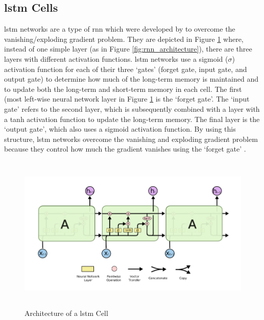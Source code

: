 \subsection{\acrlong{lstm} Cells}\label{sec:background_lstms}
\acrfull{lstm} networks are a type of \acrlong{rnn} which were developed by \citet{hochreiter1997long} to overcome the vanishing/exploding gradient problem. They are depicted in Figure \ref{fig:lstm_architecture} where, instead of one simple layer (as in Figure \ref{fig:rnn_architecture}), there are three layers with different activation functions. \acrshort{lstm} networks use a sigmoid ($\sigma$) activation function for each of their three `gates' (forget gate, input gate, and output gate) to determine how much of the long-term memory is maintained and to update both the long-term and short-term memory in each cell. The first (most left-wise neural network layer in Figure \ref{fig:lstm_architecture} is the `forget gate'. The `input gate' refers to the second layer, which is subsequently combined with a layer with a tanh activation function to update the long-term memory. The final layer is the `output gate', which also uses a sigmoid activation function. By using this structure, \acrshort{lstm} networks overcome the vanishing and exploding gradient problem because they control how much the gradient vanishes using the `forget gate' \citep{Gers}.

\begin{figure}[h]
    \centering
    \includegraphics[height=7.5cm,trim={0 0 0 0cm},clip]{paper/images/lstm.png}
    \caption{Architecture of a \acrlong{lstm} Cell \citep{olah2015understanding}}
    \label{fig:lstm_architecture}
\end{figure}

